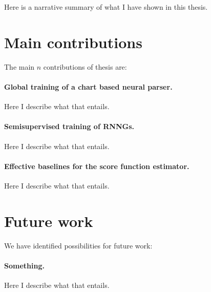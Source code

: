 Here is a narrative summary of what I have shown in this thesis.

\section{Main contributions}
The main $n$ contributions of thesis are:

\paragraph{Global training of a chart based neural parser.} Here I describe what that entails.

\paragraph{Semisupervised training of RNNGs.} Here I describe what that entails.

\paragraph{Effective baselines for the score function estimator.} Here I describe what that entails.


\section{Future work}
We have identified possibilities for future work:

\paragraph{Something.} Here I describe what that entails.
